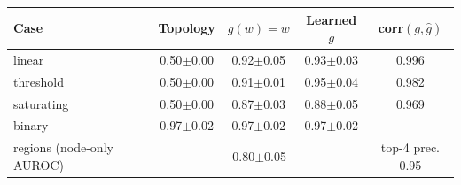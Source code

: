 \begin{tabular}{lcccc}\toprule
Case & Topology & $g(w)=w$ & Learned $g$ & corr$(g,\hat g)$ \\\midrule
linear & 0.50$\pm$0.00 & 0.92$\pm$0.05 & 0.93$\pm$0.03 & 0.996 \\
threshold & 0.50$\pm$0.00 & 0.91$\pm$0.01 & 0.95$\pm$0.04 & 0.982 \\
saturating & 0.50$\pm$0.00 & 0.87$\pm$0.03 & 0.88$\pm$0.05 & 0.969 \\
binary & 0.97$\pm$0.02 & 0.97$\pm$0.02 & 0.97$\pm$0.02 & -- \\
regions (node-only AUROC) & \multicolumn{3}{c}{0.80$\pm$0.05} & top-4 prec. 0.95 \\
\bottomrule\end{tabular}
